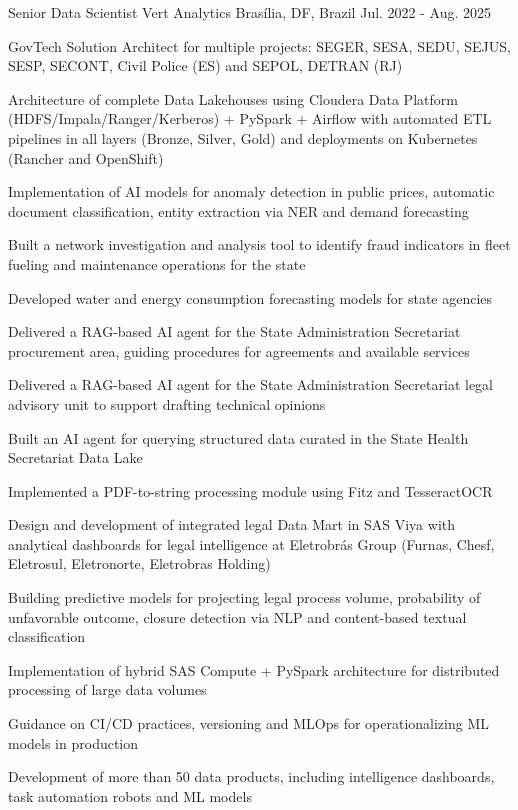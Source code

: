 \begin{cventries}
  \cventry
    {Senior Data Scientist} %
    {Vert Analytics} %
    {Brasília, DF, Brazil} %
    {Jul. 2022 - Aug. 2025} %
    {
      \begin{cvitems} %
        \item {GovTech Solution Architect for multiple projects: SEGER, SESA, SEDU, SEJUS, SESP, SECONT, Civil Police (ES) and SEPOL, DETRAN (RJ)}
        \item {Architecture of complete Data Lakehouses using Cloudera Data Platform (HDFS/Impala/Ranger/Kerberos) + PySpark + Airflow with automated ETL pipelines in all layers (Bronze, Silver, Gold) and deployments on Kubernetes (Rancher and OpenShift)}
        \item {Implementation of AI models for anomaly detection in public prices, automatic document classification, entity extraction via NER and demand forecasting}
        \item {Built a network investigation and analysis tool to identify fraud indicators in fleet fueling and maintenance operations for the state}
        \item {Developed water and energy consumption forecasting models for state agencies}
        \item {Delivered a RAG-based AI agent for the State Administration Secretariat procurement area, guiding procedures for agreements and available services}
        \item {Delivered a RAG-based AI agent for the State Administration Secretariat legal advisory unit to support drafting technical opinions}
        \item {Built an AI agent for querying structured data curated in the State Health Secretariat Data Lake}
        \item {Implemented a PDF-to-string processing module using Fitz and TesseractOCR}
        \item {Design and development of integrated legal Data Mart in SAS Viya with analytical dashboards for legal intelligence at Eletrobrás Group (Furnas, Chesf, Eletrosul, Eletronorte, Eletrobras Holding)}
        \item {Building predictive models for projecting legal process volume, probability of unfavorable outcome, closure detection via NLP and content-based textual classification}
        \item {Implementation of hybrid SAS Compute + PySpark architecture for distributed processing of large data volumes}
        \item {Guidance on CI/CD practices, versioning and MLOps for operationalizing ML models in production}
        \item {Development of more than 50 data products, including intelligence dashboards, task automation robots and ML models}
      \end{cvitems}
    }


\end{cventries}
